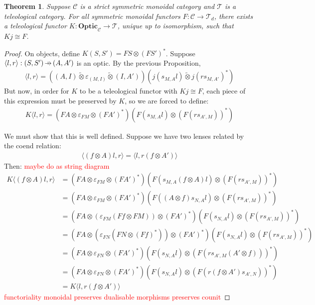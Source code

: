 \documentclass[11pt,a4paper]{article}
\theoremstyle{plain}
\newtheorem{theorem}{Theorem}[subsection]
\theoremstyle{definition}
\newcommand{\C}{\mathscr{C}}
\newcommand{\T}{\mathscr{T}}
\newcommand{\Optic}{\mathbf{Optic}}
\newcommand{\switched}{\mathbin{\tilde{\otimes}}}
\newcommand{\hto}{\ensuremath{\,\mathaccent\shortmid\rightarrow\,}}
\newcommand{\todo}[1]{\textcolor{red}{\small #1}}
\begin{document}
\begin{theorem}
\label{optic-is-free-teleological-cat}
Suppose $\C$ is a strict symmetric monoidal category and $\T$ is a teleological category. For all symmetric monoidal functors $F : \C \to \T_d$, there exists a teleological functor $K : \Optic_\C \to \T$, unique up to isomorphism, such that $Kj \cong F$.
\end{theorem}
\begin{proof}
On objects, define $K(S, S') = FS \otimes (FS')^*$. Suppose $\langle l, r \rangle : (S, S') \hto (A, A')$ is an optic. By the previous Proposition,
\begin{align*}
\langle l, r \rangle = ((A, I) \switched \varepsilon_{(M, I)} \switched (I, A'))(j(s_{M,A}l) \switched j(rs_{M,A'})^*)
\end{align*}
But now, in order for $K$ to be a teleological functor with $Kj \cong F$, each piece of this expression must be preserved by $K$, so we are forced to define:
\begin{align*}
K\langle l, r \rangle = (FA \otimes \varepsilon_{FM} \otimes (FA')^*)(F(s_{M,A}l) \otimes (F(rs_{A', M}))^* )
\end{align*}

We must show that this is well defined. Suppose we have two lenses related by the coend relation:
\begin{align*}
\langle (f \otimes A) l, r \rangle = \langle l, r (f \otimes A') \rangle
\end{align*}
Then: \todo{maybe do as string diagram}
\begin{align*}
K\langle (f \otimes A) l, r \rangle 
&= (FA \otimes \varepsilon_{FM} \otimes (FA')^*)(F(s_{M,A}(f \otimes A)l) \otimes (F(rs_{A',M}))^* ) \\
&= (FA \otimes \varepsilon_{FM} \otimes (FA')^*)(F((A \otimes f)s_{N,A}l) \otimes (F(rs_{A',M}))^* ) \\
&= (FA \otimes (\varepsilon_{FM} (Ff \otimes FM)) \otimes (FA')^*)(F(s_{N,A}l) \otimes (F(rs_{A',M}))^* ) \\
&= (FA \otimes (\varepsilon_{FN} (FN \otimes (Ff)^*)) \otimes (FA')^*)(F(s_{N,A}l) \otimes (F(rs_{A',M}))^* ) \\
&= (FA \otimes \varepsilon_{FN} \otimes (FA')^*)(F(s_{N,A}l) \otimes (F(rs_{A',M}(A' \otimes f)))^* ) \\
&= (FA \otimes \varepsilon_{FN} \otimes (FA')^*)(F(s_{N,A}l) \otimes (F(r(f \otimes A')s_{A',N}))^* ) \\
&= K\langle  l, r (f \otimes A') \rangle 
\end{align*}
\todo{functoriality} \todo{monoidal} \todo{preserves dualisable morphisms} \todo{preserves counit}
\end{proof}
\end{document}
